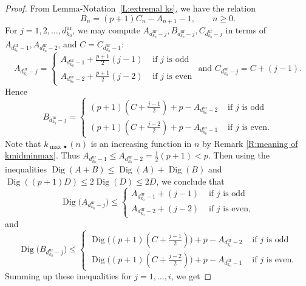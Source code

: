 \documentclass[12pt]{amsart}
\theoremstyle{definition}
\numberwithin{equation}{subsection}
\DeclareMathOperator{\Dig}{Dig}
\newcommand{\unr}{\mathrm{ur}}
\begin{document}
\begin{proof}
From Lemma-Notation~\ref{L:extremal ks}, we have the relation
\[
B_n = (p+1) C_n - A_{n+1}-1, \qquad n\geq0.
\]
For $j=1,2,...,d^\unr_{k_0}$, we may compute $A_{d_{k_0}^\unr - j},B_{d_{k_0}^\unr - j},C_{d_{k_0}^\unr - j}$ in terms of $A_{d_{k_0}^\unr - 1},A_{d_{k_0}^\unr - 2}$, and $C= C_{d_{k_0}^\unr - 1}:$
\begin{equation*}
\label{E:A_n and C_n}
A_{d_{k_0}^\unr - j} =
\begin{cases}
A_{d_{k_0}^\unr -1}+ \frac{p+1}{2} (j-1) & \textrm{ if } j \textrm{ is odd}
\\
A_{d_{k_0}^\unr -2} +\frac{p+1}{2}(j-2) & \textrm{ if } j \textrm{ is even}
\end{cases} 
\textrm {    and  }C_{d_{k_0}^\unr - j} = C+ (j-1).
\end{equation*}
Hence
\begin{equation*}
 B_{d_{k_0}^\unr - j} =
\begin{cases}
(p+1)(C+\frac{j-1}{2})+p- A_{d_{k_0}^\unr -2} &  \textrm{ if } j \textrm{ is odd}
\\
(p+1)(C+\frac{j-2}{2})+p- A_{d_{k_0}^\unr -1} & \textrm{ if } j \textrm{ is even}.
\end{cases} 
\end{equation*}
Note that $k_{\max\bullet}(n)$ is an increasing function in $n$ by Remark \ref{R:meaning of kmidminmax}.  Thus $A_{d_{k_0}^\unr -1}\leq A_{d_{k_0}^\unr -2}=\tfrac 12(p+1)<p$. Then using the inequalities $\Dig(A+B)\leq\Dig(A) + \Dig(B)  $ and $\Dig((p+1)D)\leq 2\Dig(D) \leq 2D$, we conclude that
\begin{equation*}
\nonumber
\Dig\big(A_{d_{k_0}^\unr - j}\big) \leq
\begin{cases}
A_{d_{k_0}^\unr -1}+ (j-1) &  \textrm{ if } j \textrm{ is odd}
\\
A_{d_{k_0}^\unr -2}+ (j-2) & \textrm{ if } j \textrm{ is even},
\end{cases} 
\end{equation*}
and
\begin{equation*}
\label{Eq1}
\Dig\big(B_{d_{k_0}^\unr - j}\big) \leq
\begin{cases}
\Dig\big((p+1)(C+\frac{j-1}{2})\big)+p- A_{d_{k_0}^\unr -2}&  \textrm{ if } j \textrm{ is odd}
\\
\Dig\big((p+1)(C+\frac{j-2}{2})\big)+p- A_{d_{k_0}^\unr -1}& \textrm{ if } j  \textrm{ is even}.
\end{cases} 
\end{equation*}  
Summing up these inequalities for $j=1,\dots, i$, we get


\end{proof}
\end{document}
